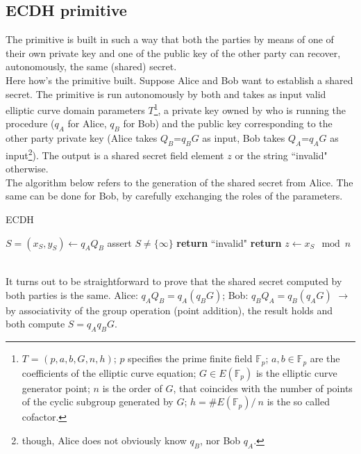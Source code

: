 \subsection{ECDH primitive}
The primitive is built in such a way that both the parties by means of one of their own private key and one of the public key of the other party can recover, autonomously, the same (shared) secret.\\
Here how's the primitive built. Suppose Alice and Bob want to establish a shared secret. The primitive is run autonomously by both and takes as input valid elliptic curve domain parameters $T$\footnote{$T$ = $(p, a, b, G, n, h)$; $p$ specifies the prime finite field $\mathbb{F}_p$; $a,b \in \mathbb{F}_p$ are the coefficients of the elliptic curve equation; $G \in E(\mathbb{F}_p)$ is the elliptic curve generator point; $n$ is the order of $G$, that coincides with the number of points of the cyclic subgroup generated by $G$; $h = \#E(\mathbb{F}_p)/\ n$ is the so called cofactor.}, a private key owned by who is running the procedure ($q_A$ for Alice, $q_B$ for Bob) and the public key corresponding to the other party private key (Alice takes $Q_B$=$q_BG$ as input, Bob takes $Q_A$=$q_AG$ as input\footnote{though, Alice does not obviously know $q_B$, nor Bob $q_A$.}). The output is a shared secret field element $z$ or the string ``invalid" otherwise.\\
The algorithm below refers to the generation of the shared secret from Alice. The same can be done for Bob, by carefully exchanging the roles of the parameters.
\begin{algorithm}
	\caption{ECDH}
	\label{alg:ECDH}
	\begin{algorithmic}[1]
		\State $S = (x_S,y_S) \gets q_AQ_B$
		\State assert $S \neq \{\infty\}$
		\State \textbf{return} ``invalid"
		\EndIf 
		\State \textbf{return} $z \gets x_S \mod{n}$ 
		\EndProcedure
	\end{algorithmic}
\end{algorithm}\\
It turns out to be straightforward to prove that the shared secret computed by both parties is the same. Alice: $q_AQ_B = q_A(q_BG)$; Bob: $q_BQ_A = q_B(q_AG)$ $\rightarrow$ by associativity of the group operation (point addition), the result holds and both compute $S=q_Aq_BG$.
